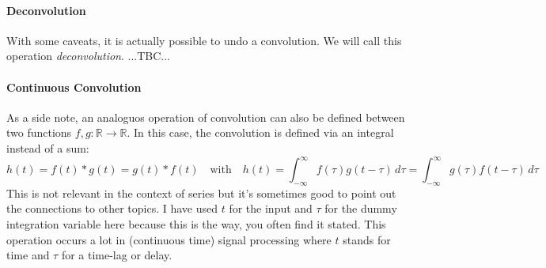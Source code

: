 


\paragraph{Deconvolution}
With some caveats, it is actually possible to undo a convolution. We will call this operation \emph{deconvolution}. ...TBC...

\paragraph{Continuous Convolution}
As a side note, an analoguos operation of convolution can also be defined between two functions $f,g: \mathbb{R} \rightarrow \mathbb{R}$. In this case, the convolution is defined via an integral instead of a sum:
\begin{equation}
 h(t) = f(t) \ast g(t) = g(t) \ast f(t) \quad \text{with} \quad
 h(t) = \int_{-\infty}^{\infty} f(\tau) g(t-\tau) \, d \tau 
      = \int_{-\infty}^{\infty} g(\tau) f(t-\tau) \, d \tau
\end{equation}
This is not relevant in the context of series but it's sometimes good to point out the connections to other topics. I have used $t$ for the input and $\tau$ for the dummy integration variable here because this is the way, you often find it stated. This operation occurs a lot in (continuous time) signal processing where $t$ stands for time and $\tau$ for a time-lag or delay.

